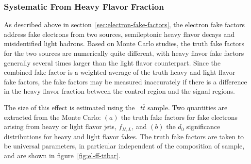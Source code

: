 \subsubsection{Systematic From Heavy Flavor Fraction}\label{sec:appendix-el-ff-hflf-syst}
As described above in section~\ref{sec:electron-fake-factors}, the electron fake factors address fake electrons from two sources, semileptonic heavy flavor decays and misidentified light hadrons. Based on Monte Carlo studies, the truth fake factors for the two sources are numerically quite different, with heavy flavor fake factors generally several times larger than the light flavor counterpart. Since the combined fake factor is a weighted average of the truth heavy and light flavor fake factors, the fake factors may be measured inaccurately if there is a difference in the heavy flavor fraction between the control region and the signal regions. 

  The size of this effect is estimated using the \mcatnlo\  $t\overline{t}$ sample. Two quantities are extracted from the Monte Carlo: $(a)$ the truth fake factors for fake electrons arising from heavy or light flavor jets, $f_{H,L}$, and $(b)$ the $d_0$ significance distributions for heavy and light flavor fakes. The truth fake factors are taken to be universal parameters, in particular independent of the composition of sample, and are shown in figure~\ref{fig:el-ff-ttbar}. 

